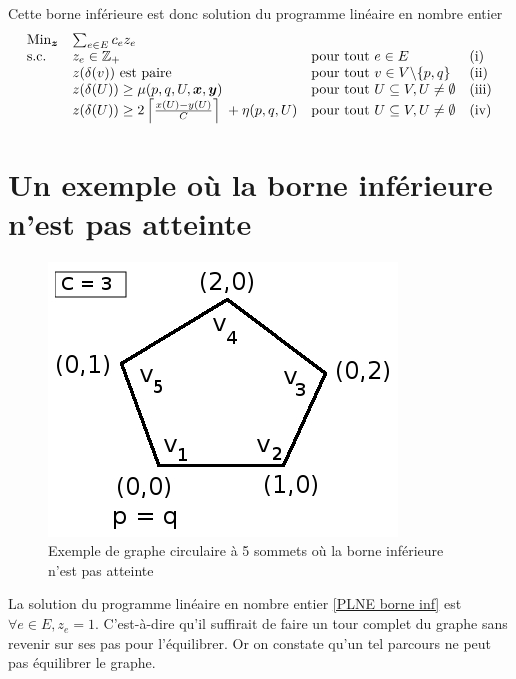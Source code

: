 \documentclass[twoside,11pt,openany,a4paper]{rapport}
\begin{document}
Cette borne inférieure est donc solution du programme linéaire en nombre entier
\begin{gather}\label{PLNE borne inf}
\begin{array}{llll}
  \mbox{Min}_{\boldsymbol{z}} &\sum_{e \in E} c_ez_e & & \\
  \mbox{s.c.}       &z_e \in \mathbb{Z}_+ &\mbox{pour tout } e \in E &\mbox{(i)} \\
                    &z(\delta(v)) \mbox{ est paire} &\mbox{pour tout } v \in V \backslash \{p,q\}&\mbox{(ii)} \\
                    &z(\delta(U)) \ge \mu(p,q,U,\boldsymbol{x},\boldsymbol{y}) &\mbox{pour tout } U \subseteq V, U \ne \emptyset &\mbox{(iii)} \\
                    &z(\delta(U)) \ge 2 \left\lceil \frac{x(U)-y(U)}{C} \right\rceil\ + \eta(p,q,U) &\mbox{pour tout } U \subseteq V, U \ne \emptyset &\mbox{(iv)}
\end{array}
\end{gather}

\section{Un exemple où la borne inférieure n'est pas atteinte}

\begin{figure}[ht]
  \label{Exemple de borne inf non atteinte}
  \center \includegraphics[scale=0.5]{BorneInfNonAtteinte-5sommets.jpg}
  \caption{Exemple de graphe circulaire à 5 sommets où la borne inférieure n'est pas atteinte}
\end{figure}

La solution du programme linéaire en nombre entier \ref{PLNE borne inf} est $\forall e \in E, z_e = 1$. C'est-à-dire qu'il suffirait de faire un tour complet du graphe sans revenir sur ses pas pour l'équilibrer. Or on constate qu'un tel parcours ne peut pas équilibrer le graphe.
\end{document}
